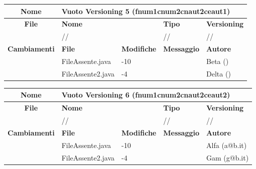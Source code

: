 \begin{table}[ht]
\footnotesize
\begin{tabular}{|c|p{2.5cm}|p{2cm}|p{2.5cm}|p{2.5cm}|}
  \hline
  \textbf{Nome}	& \multicolumn{4}{l|}{Vuoto Versioning 5 (fnum1cnum2cnaut2ceaut1)}		 							\\
  \hline
  \rowcolor{lightgray}\textbf{File} 		& \multicolumn{2}{l|}{\textbf{Nome}}		& \textbf{Tipo}		& \textbf{Versioning} 		\\
						\cline{2-5}
						& \multicolumn{2}{l|}{//}			& //			& //				\\
  \hline
  \rowcolor{lightgray}\textbf{Cambiamenti}	& \textbf{File}		&\textbf{Modifiche}	& \textbf{Messaggio}	& \textbf{Autore}		\\
						\cline{2-5}
						& FileAssente.java	& -10	  		& 			& Beta ()			\\
						\cline{2-5}
						& FileAssente2.java	& -4	  		& 			& Delta ()			\\
  \hline
\end{tabular}
\end{table}


\begin{table}[ht]
\footnotesize
\begin{tabular}{|c|p{2.5cm}|p{2cm}|p{2.5cm}|p{2.5cm}|}
  \hline
  \textbf{Nome}	& \multicolumn{4}{l|}{Vuoto Versioning 6 (fnum1cnum2cnaut2ceaut2)} 									\\
  \hline
  \rowcolor{lightgray}\textbf{File} 		& \multicolumn{2}{l|}{\textbf{Nome}}		& \textbf{Tipo}		& \textbf{Versioning} 		\\
						\cline{2-5}
						& \multicolumn{2}{l|}{//}			& //			& //				\\
  \hline
  \rowcolor{lightgray}\textbf{Cambiamenti}	& \textbf{File}		&\textbf{Modifiche}	& \textbf{Messaggio}	& \textbf{Autore}		\\
						\cline{2-5}
						& FileAssente.java	& -10	  		& 			& Alfa (a@b.it)			\\
						\cline{2-5}
						& FileAssente2.java	& -4	  		& 			& Gam (g@b.it)			\\
  \hline
\end{tabular}
\end{table}




